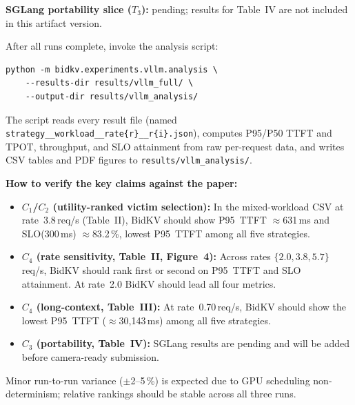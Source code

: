 \documentclass[conference]{IEEEtran}
\begin{document}
\textbf{SGLang portability slice ($T_3$):} pending; results for
Table~IV are not included in this artifact version.

\artout

After all runs complete, invoke the analysis script:

\begingroup\footnotesize\begin{verbatim}
python -m bidkv.experiments.vllm.analysis \
    --results-dir results/vllm_full/ \
    --output-dir results/vllm_analysis/
\end{verbatim}
\endgroup

The script reads every result file
(named \texttt{strategy\_\_{workload}\_\_rate\{r\}\_\_r\{i\}.json}),
computes P95/P50 TTFT and TPOT, throughput, and SLO
attainment from raw per-request data, and writes CSV tables and
PDF figures to \texttt{results/vllm\_analysis/}.

\textbf{How to verify the key claims against the paper:}

\begin{itemize}
  \item \textbf{$C_1$/$C_2$ (utility-ranked victim selection):}
    In the mixed-workload CSV at rate~3.8\,req/s (Table~II),
    BidKV should show P95~TTFT $\approx$631\,ms and
    SLO(300\,ms) $\approx$83.2\,\%, lowest P95~TTFT among all
    five strategies.

  \item \textbf{$C_4$ (rate sensitivity, Table~II, Figure~4):}
    Across rates $\{2.0, 3.8, 5.7\}$\,req/s, BidKV should rank
    first or second on P95~TTFT and SLO attainment.
    At rate~2.0 BidKV should lead all four metrics.

  \item \textbf{$C_4$ (long-context, Table~III):}
    At rate~0.70\,req/s, BidKV should show the lowest P95~TTFT
    ($\approx$30{,}143\,ms) among all five strategies.

  \item \textbf{$C_3$ (portability, Table~IV):}
    SGLang results are pending and will be added before
    camera-ready submission.
\end{itemize}

Minor run-to-run variance ($\pm$2--5\,\%) is expected due to
GPU scheduling non-determinism; relative rankings should be
stable across all three runs.
\end{document}
